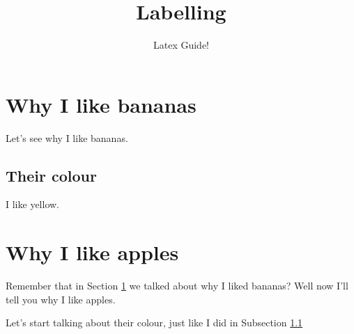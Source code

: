 \documentclass{article}
\author{Latex Guide!}
\title{Labelling}
\date{}
\begin{document}
\maketitle
{}
\tableofcontents
\newpage
{}

\section{Why I like bananas}\label{section:bananas}

Let's see why I like bananas. 

\subsection{Their colour}\label{subsection:bananascolour}
I like yellow.

\section{Why I like apples}\label{section:apples}

Remember that in Section \ref{section:bananas}  we talked about why I liked bananas? Well now I'll tell you why I like apples.

Let's start talking about their colour, just like I did in Subsection \ref{subsection:bananascolour}
\end{document}
